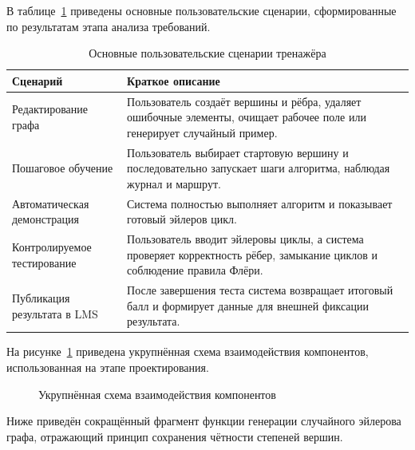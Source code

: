 \documentclass[a4paper,12pt]{extarticle}
\begin{document}

В таблице~\ref{tab:use-cases} приведены основные пользовательские сценарии, сформированные по результатам этапа анализа требований.

\begin{table}[H]
\caption{Основные пользовательские сценарии тренажёра}
\label{tab:use-cases}
\centering
\begin{tabular}{|p{3.8cm}|p{8.4cm}|}
\hline
\textbf{Сценарий} & \textbf{Краткое описание} \\ \hline
Редактирование графа & Пользователь создаёт вершины и рёбра, удаляет ошибочные элементы, очищает рабочее поле или генерирует случайный пример. \\ \hline
Пошаговое обучение & Пользователь выбирает стартовую вершину и последовательно запускает шаги алгоритма, наблюдая журнал и маршрут. \\ \hline
Автоматическая демонстрация & Система полностью выполняет алгоритм и показывает готовый эйлеров цикл. \\ \hline
Контролируемое тестирование & Пользователь вводит эйлеровы циклы, а система проверяет корректность рёбер, замыкание циклов и соблюдение правила Флёри. \\ \hline
Публикация результата в LMS & После завершения теста система возвращает итоговый балл и формирует данные для внешней фиксации результата. \\ \hline
\end{tabular}
\end{table}

На рисунке~\ref{fig:appendix-arch} приведена укрупнённая схема взаимодействия компонентов, использованная на этапе проектирования.

\begin{figure}[H]
\centering
{}
\caption{Укрупнённая схема взаимодействия компонентов}
\label{fig:appendix-arch}
\end{figure}


Ниже приведён сокращённый фрагмент функции генерации случайного эйлерова графа, отражающий принцип сохранения чётности степеней вершин.
\end{document}

